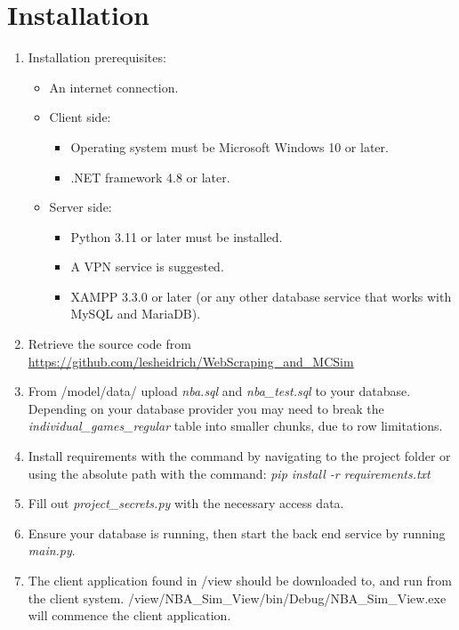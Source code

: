 \documentclass{thesis-ekf}
\theoremstyle{definition}
\theoremstyle{remark}
\begin{document}
\section{Installation}
\begin{enumerate}
	\item Installation prerequisites:
	\begin{itemize}
		\item An internet connection.
		\item Client side:
		\begin{itemize}
			\item Operating system must be Microsoft Windows 10 or later.
			\item .NET framework 4.8 or later.
		\end{itemize}
		
		\item Server side:
		\begin{itemize}
			\item Python 3.11 or later must be installed.
			\item A VPN service is suggested.
			\item XAMPP 3.3.0 or later (or any other database service that works with MySQL and MariaDB).
		\end{itemize}
	\end{itemize}
	
	\item Retrieve the source code from \url{https://github.com/lesheidrich/WebScraping_and_MCSim}
	
	\item From /model/data/ upload \emph{nba.sql} and \emph{nba\_test.sql} to your database. Depending on your database provider you may need to break the \emph{individual\_games\_regular} table into smaller chunks, due to row limitations.
	
	\item Install requirements with the command by navigating to the project folder or using the absolute path with the command: \emph{pip install -r requirements.txt}
	
	\item Fill out \emph{project\_secrets.py} with the necessary access data.
	
	\item Ensure your database is running, then start the back end service by running \emph{main.py}.
	
	\item The client application found in /view should be downloaded to, and run from the client system. /view/NBA\_Sim\_View/bin/Debug/NBA\_Sim\_View.exe will commence the client application.
\end{enumerate}
\end{document}
